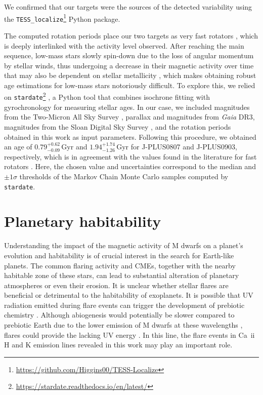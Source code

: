 We confirmed that our targets were the sources of the detected variability using the \texttt{TESS\_localize}\footnote{\url{https://github.com/Higgins00/TESS-Localize}} \citep{tess_localize} Python package.

The computed rotation periods place our two targets as very fast rotators \citep{irwin2011}, which is deeply interlinked with the activity level observed. After reaching the main sequence, low-mass stars slowly spin-down due to the loss of angular momentum by stellar winds, thus undergoing a decrease in their magnetic activity over time \citep{yang2017,davenport2019,raetz2020} that may also be dependent on stellar metallicity \citep{see24}, which makes obtaining robust age estimations for low-mass stars notoriously difficult. To explore this, we relied on \texttt{stardate}\footnote{\url{https://stardate.readthedocs.io/en/latest/}} \citep{stardate}, a Python tool that combines isochrone fitting with gyrochronology for measuring stellar ages. In our case, we included magnitudes from the Two-Micron All Sky Survey \citep[2MASS;][]{2mass}, parallax and magnitudes from \textit{Gaia} DR3, magnitudes from the Sloan Digital Sky Survey \citep[SDSS;][]{sdss}, and the rotation periods obtained in this work as input parameters. Following this procedure, we obtained an age of $0.79^{+0.62}_{-0.09}$\,Gyr and $1.94^{+1.74}_{-1.26}$\,Gyr for J-PLUS0807 and J-PLUS0903, respectively, which is in agreement with the values found in the literature for fast rotators \citep{newton2016,doyle2019}. Here, the chosen value and uncertainties correspond to the median and $\pm1\sigma$ thresholds of the Markov Chain Monte Carlo samples computed by \texttt{stardate}.




\section{Planetary habitability}
\label{sec:habitability}

Understanding the impact of the magnetic activity of M dwarfs on a planet's evolution and habitability is of crucial interest in the search for Earth-like planets. The common flaring activity and CMEs, together with the nearby habitable zone of these stars, can lead to substantial alteration of planetary atmospheres or even their erosion. It is unclear whether stellar flares are beneficial or detrimental to the habitability of exoplanets. It is possible that UV radiation emitted during flare events can trigger the development of prebiotic chemistry \citep{rimmer2018,airapetian2020}. Although abiogenesis would potentially be slower compared to prebiotic Earth due to the lower emission of M dwarfs at these wavelengths \citep{rugheimer2015,ranjan2017}, flares could provide the lacking UV energy \citep{buccino2007,jackman2023}. In this line, the flare events in Ca~{\sc ii} H and K emission lines revealed in this work may play an important role.


